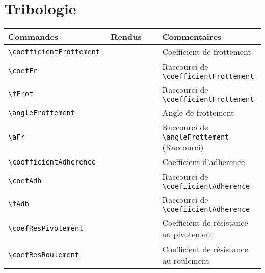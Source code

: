 \documentclass[a4paper,12pt]{article}
\newcommand{\rac}{({\color{red}Raccourci})}
\begin{document}
	\section{Tribologie}
		\noindent
		\begin{tabular}{|p{0.4\linewidth}|p{0.2\linewidth}|p{0.4\linewidth}|}
			\hline
				\textbf{Commandes}&\textbf{Rendus}&\textbf{Commentaires}
			\\\hline\hline
				\verb!\coefficientFrottement! 	&	\coefficientFrottement	&	Coefficient de frottement
			\\\hline
				\verb!\coefFr! 			&	\coefFr			&	Raccourci de \verb!\coefficientFrottement!
			\\\hline
				\verb!\fFrot! 			&	\fFrot			&	Raccourci de \verb!\coefficientFrottement!
			\\\hline
				\verb!\angleFrottement! 	&	\angleFrottement	&	Angle de frottement
			\\\hline
				\verb!\aFr! 			&	\aFr			&	Raccourci de \verb!\angleFrottement! \rac
			\\\hline
				\verb!\coefficientAdherence! 	&	\coefficientAdherence	&	Coefficient d'adhérence
			\\\hline
				\verb!\coefAdh! 		&	\coefAdh		&	Raccourci de \verb!\coefiicientAdherence!
			\\\hline
				\verb!\fAdh! 			&	\fAdh			&	Raccourci de \verb!\coefiicientAdherence!
			\\\hline
				\verb!\coefResPivotement! 	&	\coefResPivotement	&	Coefficient de résistance au pivotement
			\\\hline
				\verb!\coefResRoulement! 	&	\coefResRoulement	&	Coefficient de résistance au roulement
			\\\hline
		\end{tabular}
\end{document}
